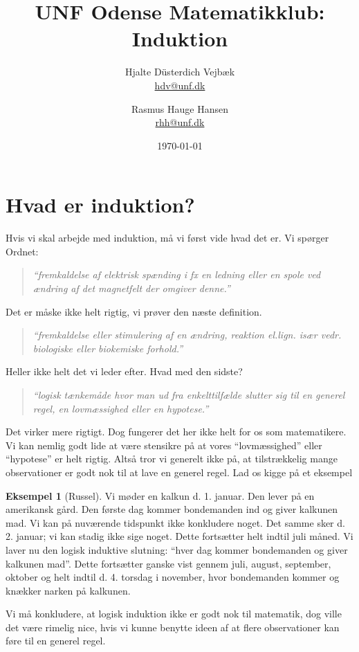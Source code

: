 \documentclass[a4paper, 12pt]{article}
\numberwithin{equation}{section}
\theoremstyle{plain}
\theoremstyle{definition}
\newtheorem{eksempel}[saetning]{Eksempel}
\begin{document}
\title{UNF Odense Matematikklub: Induktion}
\author{Hjalte Düsterdich Vejbæk\\ \href{mailto:hdv@unf.dk}{hdv@unf.dk}\and Rasmus Hauge Hansen\\ \href{mailto:rhh@unf.dk}{rhh@unf.dk}}
\date{\today}
\maketitle{}
\thispagestyle{empty}

\newpage

\section{Hvad er induktion?}
Hvis vi skal arbejde med induktion, må vi først vide hvad det er. Vi spørger Ordnet:
    \begin{quote}
        \textit{``fremkaldelse af elektrisk spænding i fx en ledning eller en spole ved ændring af det magnetfelt der omgiver denne.''}
    \end{quote}
    Det er måske ikke helt rigtig, vi prøver den næste definition.
    \begin{quote}
        \textit{``fremkaldelse eller stimulering af en ændring, reaktion el.lign. især vedr. biologiske eller biokemiske forhold.''}
    \end{quote}
    Heller ikke helt det vi leder efter. Hvad med den sidste?
    \begin{quote}
        \textit{``logisk tænkemåde hvor man ud fra enkelttilfælde slutter sig til en generel regel, en lovmæssighed eller en hypotese.''}
    \end{quote}
    Det virker mere rigtigt. Dog fungerer det her ikke helt for os som matematikere. Vi kan nemlig godt lide at være stensikre på at vores ``lovmæssighed'' eller ``hypotese'' er helt rigtig. Altså tror vi generelt ikke på, at tilstrækkelig mange observationer er godt nok til at lave en generel regel. Lad os kigge på et eksempel
    \begin{eksempel}[Russel]
        Vi møder en kalkun d. 1. januar. Den lever på en amerikansk gård. Den første dag kommer bondemanden ind og giver kalkunen mad. Vi kan på nuværende tidspunkt ikke konkludere noget. Det samme sker d. 2. januar; vi kan stadig ikke sige noget. Dette fortsætter helt indtil juli måned. Vi laver nu den logisk induktive slutning: ``hver dag kommer bondemanden og giver kalkunen mad''. Dette fortsætter ganske vist gennem juli, august, september, oktober og helt indtil d. 4. torsdag i november, hvor bondemanden kommer og knækker narken på kalkunen.
    \end{eksempel}
    Vi må konkludere, at logisk induktion ikke er godt nok til matematik, dog ville det være rimelig nice, hvis vi kunne benytte ideen af at flere observationer kan føre til en generel regel.
    
\end{document}
